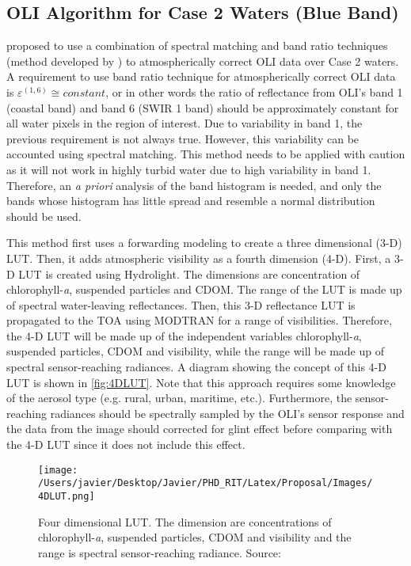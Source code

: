 \subsection{OLI Algorithm for Case 2 Waters (Blue Band)}
\cite{GeraceThesis} proposed to use a combination of spectral matching and band ratio techniques (method developed by \cite{Gordon:1997}) to atmospherically correct OLI data over Case 2 waters. A requirement to use band ratio technique for atmospherically correct OLI data is $\varepsilon^{(1,6)}\cong constant$, or in other words the ratio of reflectance from OLI's band 1 (coastal band) and band 6 (SWIR 1 band) should be approximately constant for all water pixels in the region of interest. Due to variability in band 1, the previous requirement is not always true. However, this variability can be accounted using spectral matching. This method needs to be applied with caution as it will not work in highly turbid water due to high variability in band 1. Therefore, an {\it a priori} analysis of the band histogram is needed, and only the bands whose histogram has little spread and resemble a normal distribution should be used.

This method first uses a forwarding modeling to create a three dimensional (3-D) LUT. Then, it adds atmospheric visibility as a fourth dimension (4-D). First, a 3-D LUT is created using Hydrolight. The dimensions are concentration of chlorophyll-{\it a}, suspended particles and CDOM. The range of the LUT is made up of spectral water-leaving reflectances. Then, this 3-D reflectance LUT is propagated to the TOA using MODTRAN for a range of visibilities. Therefore, the 4-D LUT will be made up of the independent variables chlorophyll-{\it a}, suspended particles, CDOM and visibility, while the range will be made up of spectral sensor-reaching radiances. A diagram showing the concept of this 4-D LUT is shown in \autoref{fig:4DLUT}. Note that this approach requires some knowledge of the aerosol type (e.g. rural, urban, maritime, etc.). Furthermore, the sensor-reaching radiances should be spectrally sampled by the OLI's sensor response and the data from the image should corrected for glint effect before comparing with the 4-D LUT since it does not include this effect.

\begin{figure}[htb]
  \centering
  \texttt{[image: /Users/javier/Desktop/Javier/PHD\_RIT/Latex/Proposal/Images/4DLUT.png]}
  \caption{Four dimensional LUT. The dimension are concentrations of chlorophyll-{\it a}, suspended particles, CDOM and visibility and the range is spectral sensor-reaching radiance. Source: \cite{GeraceThesis}}
  \label{fig:4DLUT} 
\end{figure}

